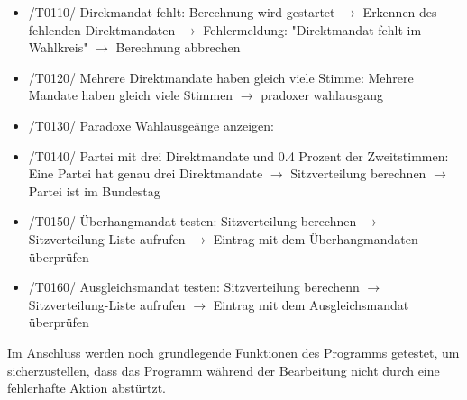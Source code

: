 \documentclass[10pt,a4paper]{article}
\begin{document}
\begin{itemize}
	\item /T0110/ Direkmandat fehlt: \newline
	Berechnung wird gestartet $\rightarrow$ Erkennen des fehlenden Direktmandaten $\rightarrow$ Fehlermeldung: "Direktmandat fehlt im Wahlkreis" $\rightarrow$ Berechnung abbrechen
	\item /T0120/ Mehrere Direktmandate haben gleich viele Stimme: \newline
	Mehrere Mandate haben gleich viele Stimmen $\rightarrow$ pradoxer wahlausgang
	\item /T0130/ Paradoxe Wahlausgeänge anzeigen:\newline
	\item /T0140/ Partei mit drei Direktmandate und 0.4 Prozent der Zweitstimmen: \newline
	Eine Partei hat genau drei Direktmandate $\rightarrow$ Sitzverteilung berechnen $\rightarrow$ Partei ist im Bundestag
	\item /T0150/ Überhangmandat testen: \newline
	Sitzverteilung berechnen $\rightarrow$ Sitzverteilung-Liste aufrufen $\rightarrow$ Eintrag mit dem Überhangmandaten überprüfen  
	\item /T0160/ Ausgleichsmandat testen: \newline
	Sitzverteilung berechenn $\rightarrow$ Sitzverteilung-Liste	aufrufen $\rightarrow$ Eintrag mit dem 
	Ausgleichsmandat überprüfen
\end{itemize}
Im Anschluss werden noch grundlegende Funktionen des Programms getestet, um sicherzustellen, dass das Programm während der Bearbeitung nicht durch eine fehlerhafte Aktion abstürtzt.
\end{document}
